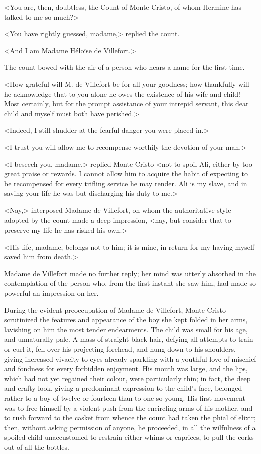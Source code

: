 <You are, then, doubtless, the Count of Monte Cristo, of whom Hermine has talked to me so much?> 

 <You have rightly guessed, madame,> replied the count. 

 <And I am Madame Héloïse de Villefort.> 

 The count bowed with the air of a person who hears a name for the first time. 

 <How grateful will M. de Villefort be for all your goodness; how thankfully will he acknowledge that to you alone he owes the existence of his wife and child! Most certainly, but for the prompt assistance of your intrepid servant, this dear child and myself must both have perished.> 

 <Indeed, I still shudder at the fearful danger you were placed in.> 

 <I trust you will allow me to recompense worthily the devotion of your man.> 

 <I beseech you, madame,> replied Monte Cristo <not to spoil Ali, either by too great praise or rewards. I cannot allow him to acquire the habit of expecting to be recompensed for every trifling service he may render. Ali is my slave, and in saving your life he was but discharging his duty to me.> 

 <Nay,> interposed Madame de Villefort, on whom the authoritative style adopted by the count made a deep impression, <nay, but consider that to preserve my life he has risked his own.> 

 <His life, madame, belongs not to him; it is mine, in return for my having myself saved him from death.> 

 Madame de Villefort made no further reply; her mind was utterly absorbed in the contemplation of the person who, from the first instant she saw him, had made so powerful an impression on her. 

 During the evident preoccupation of Madame de Villefort, Monte Cristo scrutinized the features and appearance of the boy she kept folded in her arms, lavishing on him the most tender endearments. The child was small for his age, and unnaturally pale. A mass of straight black hair, defying all attempts to train or curl it, fell over his projecting forehead, and hung down to his shoulders, giving increased vivacity to eyes already sparkling with a youthful love of mischief and fondness for every forbidden enjoyment. His mouth was large, and the lips, which had not yet regained their colour, were particularly thin; in fact, the deep and crafty look, giving a predominant expression to the child's face, belonged rather to a boy of twelve or fourteen than to one so young. His first movement was to free himself by a violent push from the encircling arms of his mother, and to rush forward to the casket from whence the count had taken the phial of elixir; then, without asking permission of anyone, he proceeded, in all the wilfulness of a spoiled child unaccustomed to restrain either whims or caprices, to pull the corks out of all the bottles. 

